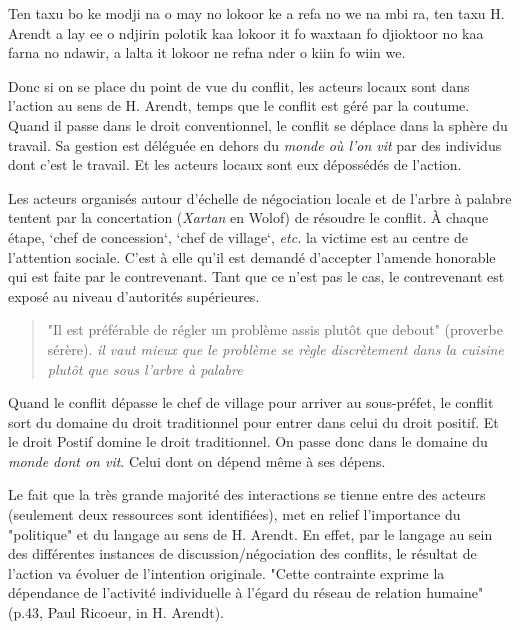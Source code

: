 \begin{paracol}{2}
  Ten taxu bo ke modji na o may no lokoor ke a refa no we na mbi ra, ten taxu H. Arendt a lay ee o ndjirin polotik kaa lokoor it fo waxtaan fo djioktoor no kaa farna no ndawir, a lalta it lokoor ne refna nder o kiin fo wiin we.

  \switchcolumn %
  Donc si on se place du point de vue du conflit, les acteurs locaux sont dans l'action au sens de H. Arendt, temps que le conflit est géré par la coutume. Quand il passe dans le droit conventionnel, le conflit se déplace dans la sphère du travail. Sa gestion est déléguée en dehors du \textit{monde où l'on vit} par des individus dont c'est le travail. Et les acteurs locaux sont eux dépossédés de l'action.

  Les acteurs organisés autour d’échelle de négociation locale et de l'arbre à palabre tentent par la concertation (\textit{Xartan} en Wolof) de résoudre le conflit. À chaque étape, `chef de concession`, `chef de village`, \textit{etc.} la victime est au centre de l'attention sociale. C'est à elle qu'il est demandé d'accepter l'amende honorable qui est faite par le contrevenant. Tant que ce n'est pas le cas, le contrevenant est exposé au niveau d'autorités supérieures.

  \begin{quote}
      "Il est préférable de régler un problème assis plutôt que debout" (proverbe sérère). \textit{il vaut mieux que le problème se règle discrètement dans la cuisine plutôt que sous l'arbre à palabre}
  \end{quote}


  Quand le conflit dépasse le chef de village pour arriver au sous-préfet, le conflit sort du domaine du droit traditionnel pour entrer dans celui du droit positif. Et le droit Postif domine le droit traditionnel. On passe donc dans le domaine du \textit{monde dont on vit}. Celui dont on dépend même à ses dépens.

  Le fait que la très grande majorité des interactions se tienne  entre des  acteurs (seulement deux ressources sont identifiées), met en relief l'importance du "politique" et du langage au sens de H. Arendt\cite{arendt_condition_2020}. En effet, par le langage au sein des différentes instances de discussion/négociation des conflits, le résultat de l'action va évoluer de l'intention originale. "Cette contrainte exprime la dépendance de l'activité individuelle à l'égard du réseau de relation humaine" (p.43, Paul Ricoeur, in H. Arendt\cite{arendt_condition_2020}).
\end{paracol}

